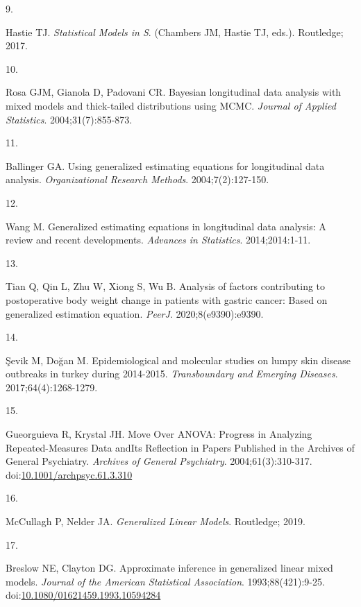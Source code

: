 \documentclass[
]{article}
\newlength{\cslhangindent}
\newlength{\csllabelwidth}
\newlength{\cslentryspacingunit} %
\newenvironment{CSLReferences}[2] %
 {%
  \setlength{\parindent}{0pt}
  \ifodd #1
  \let\oldpar\par
  \def\par{\hangindent=\cslhangindent\oldpar}
  \fi
  \setlength{\parskip}{#2\cslentryspacingunit}
 }%
 {}
\newcommand{\CSLLeftMargin}[1]{\parbox[t]{\csllabelwidth}{#1}}
\newcommand{\CSLRightInline}[1]{\parbox[t]{\linewidth - \csllabelwidth}{#1}\break}
\begin{document}
\begin{CSLReferences}{0}{0}
\leavevmode{}%
\CSLLeftMargin{9. }%
\CSLRightInline{Hastie TJ. \emph{Statistical Models in {S}}. (Chambers
JM, Hastie TJ, eds.). Routledge; 2017.}

\leavevmode{}%
\CSLLeftMargin{10. }%
\CSLRightInline{Rosa GJM, Gianola D, Padovani CR. Bayesian longitudinal
data analysis with mixed models and thick-tailed distributions using
{MCMC}. \emph{Journal of Applied Statistics}. 2004;31(7):855-873.}

\leavevmode{}%
\CSLLeftMargin{11. }%
\CSLRightInline{Ballinger GA. Using generalized estimating equations for
longitudinal data analysis. \emph{Organizational Research Methods}.
2004;7(2):127-150.}

\leavevmode{}%
\CSLLeftMargin{12. }%
\CSLRightInline{Wang M. Generalized estimating equations in longitudinal
data analysis: A review and recent developments. \emph{Advances in
Statistics}. 2014;2014:1-11.}

\leavevmode{}%
\CSLLeftMargin{13. }%
\CSLRightInline{Tian Q, Qin L, Zhu W, Xiong S, Wu B. Analysis of factors
contributing to postoperative body weight change in patients with
gastric cancer: Based on generalized estimation equation. \emph{PeerJ}.
2020;8(e9390):e9390.}

\leavevmode{}%
\CSLLeftMargin{14. }%
\CSLRightInline{Şevik M, Doğan M. Epidemiological and molecular studies
on lumpy skin disease outbreaks in turkey during 2014-2015.
\emph{Transboundary and Emerging Diseases}. 2017;64(4):1268-1279.}

\leavevmode{}%
\CSLLeftMargin{15. }%
\CSLRightInline{Gueorguieva R, Krystal JH. {Move Over ANOVA: Progress in
Analyzing Repeated-Measures Data andIts Reflection in Papers Published
in the Archives of General Psychiatry}. \emph{Archives of General
Psychiatry}. 2004;61(3):310-317.
doi:\href{https://doi.org/10.1001/archpsyc.61.3.310}{10.1001/archpsyc.61.3.310}}

\leavevmode{}%
\CSLLeftMargin{16. }%
\CSLRightInline{McCullagh P, Nelder JA. \emph{Generalized Linear
Models}. Routledge; 2019.}

\leavevmode{}%
\CSLLeftMargin{17. }%
\CSLRightInline{Breslow NE, Clayton DG. Approximate inference in
generalized linear mixed models. \emph{Journal of the American
Statistical Association}. 1993;88(421):9-25.
doi:\href{https://doi.org/10.1080/01621459.1993.10594284}{10.1080/01621459.1993.10594284}}


\end{CSLReferences}
\end{document}
